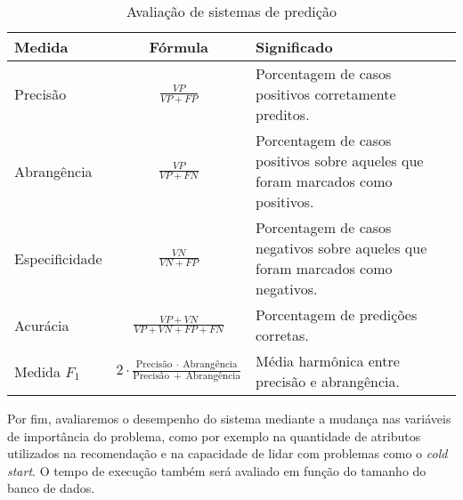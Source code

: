 \begin{table}[H]
\begin{center}
    \caption{Avaliação de sistemas de predição}
    \label{tab:avaliacao-predicao}
    \begin{tabular}{ | l | c | p{5cm} | }
    \hline
    \textbf{Medida} & \textbf{Fórmula} & \textbf{Significado} \\ \hline
    Precisão &  $\frac{VP}{VP+FP}$ & Porcentagem de casos positivos corretamente preditos. \\ \hline                            
    Abrangência & $\frac{VP}{VP+FN}$ & Porcentagem de casos positivos sobre aqueles que foram marcados como positivos. \\ \hline
    Especificidade & $\frac{VN}{VN+FP}$ &  Porcentagem de casos negativos sobre aqueles que foram marcados como negativos. \\ \hline
    Acurácia & $\frac{VP+VN}{VP+VN+FP+FN}$ & Porcentagem de predições corretas. \\ \hline
    Medida $F_1$ &  $2 \cdot \frac{\mathrm{Precisão}~\cdot~\mathrm{Abrangência}}{\mathrm{Precisão}~+~\mathrm{Abrangência}}$ & Média harmônica entre precisão e abrangência. \\ \hline
    \end{tabular}
\end{center}
\end{table}

Por fim, avaliaremos o desempenho do sistema mediante a mudança nas variáveis de importância do problema, como por exemplo na quantidade de atributos utilizados na recomendação e na capacidade de lidar com problemas como o \textit{cold start}. O tempo de execução também será avaliado em função do tamanho do banco de dados.